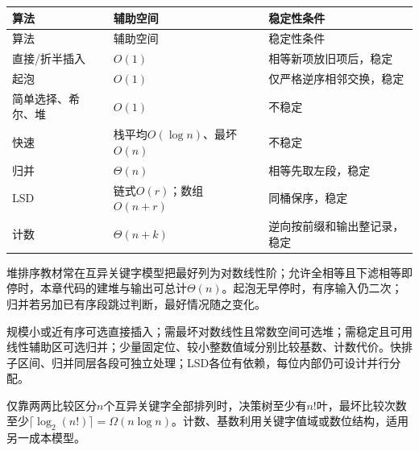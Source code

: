 \par\smallskip
{\fontsize{9.3}{12}\selectfont\setlength{\tabcolsep}{2.5pt}\setlength{\LTleft}{0pt}\setlength{\LTright}{0pt}
\begin{longtable}{@{}>{\raggedright\arraybackslash}p{}>{\raggedright\arraybackslash}p{}>{\raggedright\arraybackslash}p{}@{}}
\toprule
算法 & 辅助空间 & 稳定性条件 \\

\midrule\endfirsthead\toprule
算法 & 辅助空间 & 稳定性条件 \\

\midrule\endhead\bottomrule\endfoot
直接/折半插入 & \(O(1)\) & 相等新项放旧项后，稳定 \\

起泡 & \(O(1)\) & 仅严格逆序相邻交换，稳定 \\

简单选择、希尔、堆 & \(O(1)\) & 不稳定 \\

快速 & 栈平均\(O(\log n)\)、最坏\(O(n)\) & 不稳定 \\

归并 & \(\Theta(n)\) & 相等先取左段，稳定 \\

LSD & 链式\(O(r)\)；数组\(O(n+r)\) & 同桶保序，稳定 \\

计数 & \(\Theta(n+k)\) & 逆向按前缀和输出整记录，稳定 \\

\end{longtable}}
\par\smallskip

堆排序教材常在互异关键字模型把最好列为对数线性阶；允许全相等且下滤相等即停时，本章代码的建堆与输出可总计\(\Theta(n)\)。起泡无早停时，有序输入仍二次；归并若另加已有序段跳过判断，最好情况随之变化。

规模小或近有序可选直接插入；需最坏对数线性且常数空间可选堆；需稳定且可用线性辅助区可选归并；少量固定位、较小整数值域分别比较基数、计数代价。快排子区间、归并同层各段可独立处理；LSD各位有依赖，每位内部仍可设计并行分配。

仅靠两两比较区分\(n\)个互异关键字全部排列时，决策树至少有\(n!\)叶，最坏比较次数至少\(\lceil\log_2(n!)\rceil=\Omega(n\log n)\)。计数、基数利用关键字值域或数位结构，适用另一成本模型。
